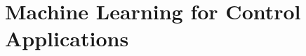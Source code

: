 \documentclass[12pt]{report}
\begin{document}
\chapter{Machine Learning for Control Applications}


% 

% 

\printbibliography

\appendix

% 

% 

% 
\end{document}
